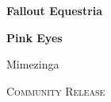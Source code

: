 \begin{titlepage}
    
\begin{center}


{\huge \bfseries
Fallout Equestria
}

\vspace{3em}

{\LARGE \bfseries
Pink Eyes
}

\vspace{5em}

{\large Mimezinga}

\vfill

{\scshape Community Release}


\end{center}

\end{titlepage}


